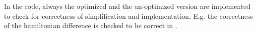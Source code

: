 
In the code, always the optimized and the un-optimized version are implemented to check for correctness of simplification and implementation.
E.g. the correctness of the hamiltonian difference is checked to be correct in .